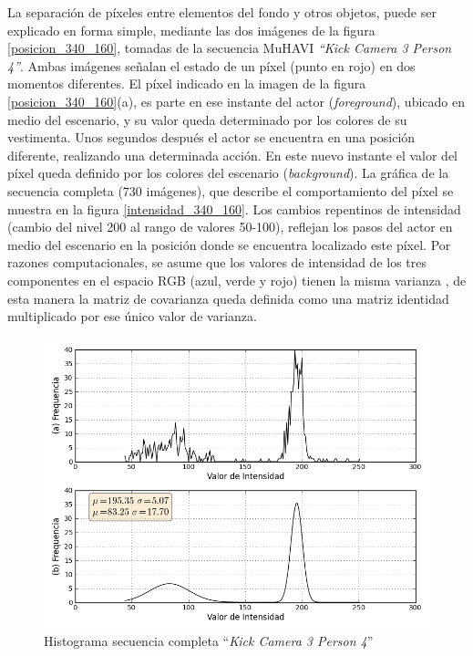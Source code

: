 La separación de píxeles entre elementos del fondo y otros objetos, puede ser explicado en forma simple, mediante las dos imágenes de la figura \ref{posicion_340_160}, tomadas de la secuencia MuHAVI \textit{``Kick Camera 3 Person 4''}\cite{singh_muhavi_2010}. Ambas imágenes señalan el estado de un píxel (punto en rojo) en dos momentos diferentes. El píxel indicado en la imagen de la figura \ref{posicion_340_160}(a), es parte en ese instante del actor (\textit{foreground}), ubicado en medio del escenario, y su valor queda determinado por los colores de su vestimenta. Unos segundos después el actor se encuentra en una posición diferente, realizando una determinada acción. En este nuevo instante el valor del píxel queda definido por los colores del escenario (\textit{background}). La gráfica de la secuencia completa (730 imágenes), que describe el comportamiento del píxel se muestra en la figura \ref{intensidad_340_160}. Los cambios repentinos de intensidad (cambio del nivel 200 al rango de valores 50-100), reflejan los pasos del actor en medio del escenario en la posición donde se encuentra localizado este píxel. Por razones computacionales, se asume que los valores de intensidad de los tres componentes en el espacio RGB (azul, verde y rojo) tienen la misma varianza \cite{zivkovic_efficient_2006}, de esta manera la matriz de covarianza queda definida como una matriz identidad multiplicado por ese único valor de varianza.

\begin{figure}[h!]
  \centering
      \includegraphics[scale=0.75]{img/histograma_pixel_340_160_3_2}
  \caption[Histograma secuencia completa ``\textit{Kick Camera 3 Person 4}'']{Histograma secuencia completa ``\textit{Kick Camera 3 Person 4}''}
\label{histograma}
\end{figure}

